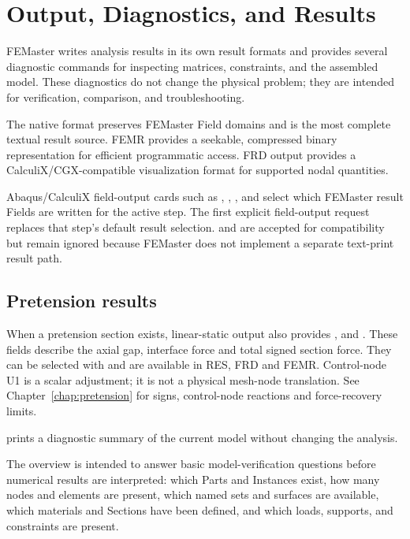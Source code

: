 \chapter{Output, Diagnostics, and Results}
\label{chap:output-results}

FEMaster writes analysis results in its own result formats and provides several diagnostic commands for inspecting matrices, constraints, and the assembled model. These diagnostics do not change the physical problem; they are intended for verification, comparison, and troubleshooting.

The native  format preserves FEMaster Field domains and is the most complete textual result source. FEMR provides a seekable, compressed binary representation for efficient programmatic access. FRD output provides a CalculiX/CGX-compatible visualization format for supported nodal quantities.

Abaqus/CalculiX field-output cards such as , , , and  select which FEMaster result Fields are written for the active step. The first explicit field-output request replaces that step's default result selection.  and  are accepted for compatibility but remain ignored because FEMaster does not implement a separate text-print result path.

\section*{Pretension results}
When a pretension section exists, linear-static output also provides ,
 and . These fields describe the axial gap, interface force
and total signed section force. They can be selected with  and
are available in RES, FRD and FEMR. Control-node U1 is a scalar adjustment;
it is not a physical mesh-node translation. See Chapter~\ref{chap:pretension}
for signs, control-node reactions and force-recovery limits.


 prints a diagnostic summary of the current model without changing the analysis.

The overview is intended to answer basic model-verification questions before numerical results are interpreted: which Parts and Instances exist, how many nodes and elements are present, which named sets and surfaces are available, which materials and Sections have been defined, and which loads, supports, and constraints are present.


